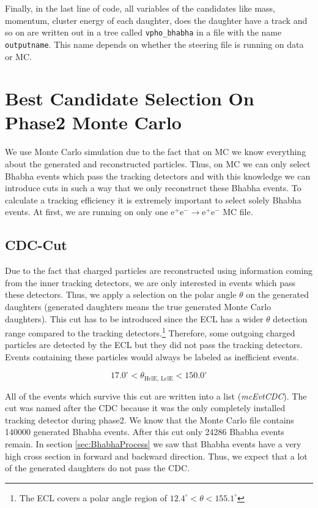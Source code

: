 \documentclass[a4paper,11pt,twosided,final,german,openbib,pdftex,listof=totoc,bibliography=totoc]{scrbook}
\begin{document}
Finally, in the last line of code, all variables of the candidates like mass, momentum, cluster energy of each daughter, does the daughter have a track and so on are written out in a tree called \texttt{vpho\_bhabha} in a file with the name \texttt{outputname}. This name depends on whether the steering file is running on data or MC.


\section{Best Candidate Selection On Phase2 Monte Carlo}
\label{sec:SelectingBhabhaMC}

We use Monte Carlo simulation due to the fact that on MC we know everything about the generated and reconstructed particles. Thus, on MC we can only select Bhabha events which pass the tracking detectors and with this knowledge we can introduce cuts in such a way that we only reconstruct these Bhabha events. To calculate a tracking efficiency it is extremely important to select solely Bhabha events. At first, we are running on only one $\textrm{e}^+ \textrm{e}^- \rightarrow \textrm{e}^+ \textrm{e}^-$ MC file.


\subsection{CDC-Cut}

Due to the fact that charged particles are reconstructed using information coming from the inner tracking detectors, we are only interested in events which pass these detectors. Thus, we apply a selection on the polar angle $\theta$ on the generated daughters (generated daughters means the true generated Monte Carlo daughters). This cut has to be introduced since the ECL has a wider $\theta$ detection range compared to the tracking detectors.\footnote{The ECL covers a polar angle region of $12.4^{\circ} < \theta < 155.1^{\circ}$} Therefore, some outgoing charged particles are detected by the ECL but they did not pass the tracking detectors. Events containing these particles would always be labeled as inefficient events.


\begin{equation}
	17.0^\circ < \theta_{\textrm{HclE, LclE}} < 150.0^\circ
\end{equation}

All of the events which survive this cut are written into a list (\textit{mcEvtCDC}). The cut was named after the CDC because it was the only completely installed tracking detector during phase2. We know that the Monte Carlo file contains 140000 generated Bhabha events. After this cut only 24286 Bhabha events remain.
In section \ref{sec:BhabhaProcess} we saw that Bhabha events have a very high cross section in forward and backward  direction. Thus, we expect that a lot of the generated daughters do not pass the CDC. 
\newline
\end{document}
